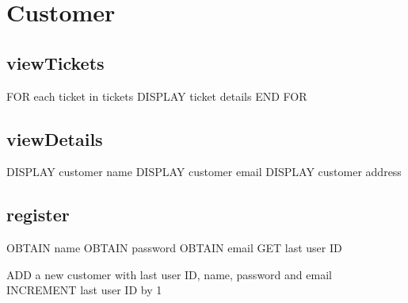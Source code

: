 \section{Customer}

\subsection{viewTickets}
\begin{pc}
FOR each ticket in tickets
	DISPLAY ticket details
END FOR
\end{pc}

\subsection{viewDetails}
\begin{pc}
DISPLAY customer name
DISPLAY customer email
DISPLAY customer address
\end{pc}

\subsection{register}
\begin{pc}
OBTAIN name
OBTAIN password
OBTAIN email
GET last user ID

ADD a new customer with last user ID, name, password and email
INCREMENT last user ID by 1
\end{pc}

